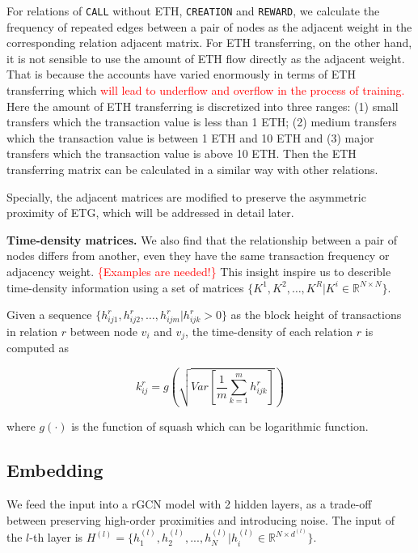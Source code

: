For relations of \texttt{CALL} without ETH, \texttt{CREATION} and \texttt{REWARD}, we calculate the frequency of repeated edges between a pair of nodes as the adjacent weight in the corresponding relation adjacent matrix. For ETH transferring, on the other hand, it is not sensible to use the amount of ETH flow directly as the adjacent weight. That is because the accounts have varied enormously in terms of ETH transferring which \textcolor{red}{will lead to underflow and overflow in the process of training.} Here the amount of ETH transferring is discretized into three ranges: (1) small transfers which the transaction value is less than 1 ETH; (2) medium transfers which the transaction value is between 1 ETH and 10 ETH and (3) major transfers which the transaction value is above 10 ETH. Then the ETH transferring matrix can be calculated in a similar way with other relations.

Specially, the adjacent matrices are modified to preserve the asymmetric proximity of ETG, which will be addressed in detail later. 

\textbf{Time-density matrices.} We also find that the relationship between a pair of nodes differs from another, even they have the same transaction frequency or adjacency weight. \textcolor{red}{\{Examples are needed!\}}
This insight inspire us to describle time-density information using a set of matrices $\{K^1,K^2,\dots,K^R|K^i\in \mathbb{R}^{N \times N}\}$. 

Given a sequence $\{h_{ij1}^r,h_{ij2}^r,\dots,h_{ijm}^r | h_{ijk}^r>0\}$ as the block height of transactions in relation $r$ between node $v_i$ and $v_j$, the time-density of each relation $r$ is computed as%

\begin{equation}
k_{ij}^r=g(\sqrt{Var[\frac{1}{m}\sum_{k=1}^m h_{ijk}^r]})
\label{eq:time}
\end{equation}

\noindent where $g(\cdot)$ is the function of squash which can be logarithmic function.

\subsection{Embedding}
\label{sec:rGCN layers}
 We feed the input into a rGCN model with 2 hidden layers, as a trade-off between preserving high-order proximities and introducing noise. The input of the $l$-th layer is $H^{(l)}=\{h_1^{(l)},h_2^{(l)},...,h_N^{(l)}|h_i^{(l)}\in \mathbb{R}^{N \times d^{(l)}}\}$.

